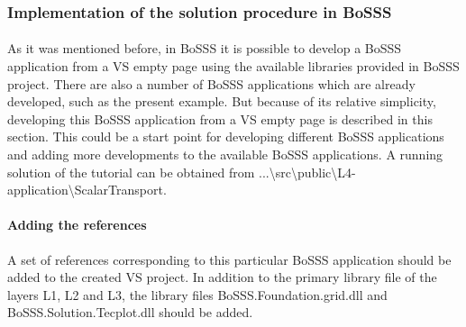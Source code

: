 \documentclass[11pt,twoside,a4paper]{fdyartcl}
\begin{document}
\subsubsection{Implementation of the solution procedure in BoSSS}
\paragraph{} As it was mentioned before, in BoSSS it is possible to develop a BoSSS application from a VS empty page using the available libraries provided in BoSSS project. There are also a number of BoSSS applications which are already developed, such as the present example. But because of its relative simplicity, developing this BoSSS application from a VS empty page is described in this section. This could be a start point for developing different BoSSS applications and adding more developments to the available BoSSS applications.
A running solution of the tutorial can be obtained from {\scriptsize ...\textbackslash src\textbackslash public\textbackslash L4-application\textbackslash ScalarTransport}.
\paragraph{Adding the references} A set of references corresponding to this particular BoSSS application should be added to the created VS project. In addition to the primary library file of the layers L1, L2 and L3, the library files {\scriptsize BoSSS.Foundation.grid.dll} and {\scriptsize BoSSS.Solution.Tecplot.dll} should be added.
\end{document}

